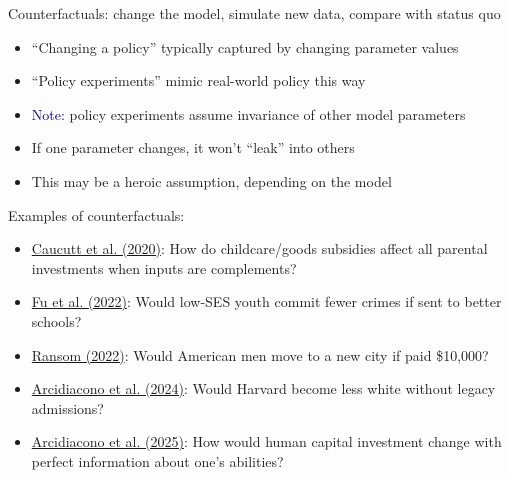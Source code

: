 \documentclass[aspectratio=169]{beamer}
\begin{document}
\begin{frame}

Counterfactuals: change the model, simulate new data, compare with status quo

\bigskip{}

\begin{itemize}
\itemsep1.5em
\item<2-> ``Changing a policy'' typically captured by changing parameter values
\item<3-> ``Policy experiments'' mimic real-world policy this way
\item<4-> \textcolor{navy}{Note:} policy experiments assume invariance of other model parameters
\item<5-> If one parameter changes, it won't ``leak'' into others
\item<6-> This may be a heroic assumption, depending on the model
\end{itemize}

\end{frame}

\begin{frame}

Examples of counterfactuals:

\bigskip{}

\begin{itemize}
\itemsep1.5em
\item<2-> \href{https://www.nber.org/papers/w27838}{Caucutt et al. (2020)}:  How do childcare/goods subsidies affect all parental investments when inputs are complements?
\item<3-> \href{https://onlinelibrary.wiley.com/doi/full/10.3982/QE1722}{Fu et al. (2022)}: Would low-SES youth commit fewer crimes if sent to better schools?
\item<4-> \href{https://jhr.uwpress.org/content/early/2021/03/02/jhr.monopsony.0219-10013R2}{Ransom (2022)}: Would American men move to a new city if paid \$10,000?
\item<5-> \href{https://jhr.uwpress.org/content/early/2022/01/04/jhr.0421-11641R1}{Arcidiacono et al. (2024)}: Would Harvard become less white without legacy admissions?
\item<6-> \href{https://www.journals.uchicago.edu/doi/abs/10.1086/732526}{Arcidiacono et al. (2025)}: How would human capital investment change with perfect information about one's abilities?
\end{itemize}

\end{frame}
\end{document}
